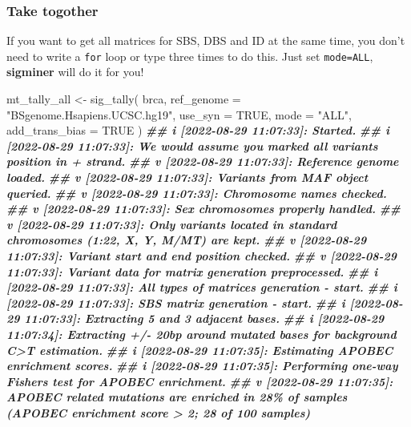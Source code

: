 \documentclass[
  12pt,
  a4paper,
  twoside]{book}
\newenvironment{Shaded}{\begin{snugshade}}{\end{snugshade}}
\newcommand{\AttributeTok}[1]{\textcolor[rgb]{0.77,0.63,0.00}{#1}}
\newcommand{\ConstantTok}[1]{\textcolor[rgb]{0.00,0.00,0.00}{#1}}
\newcommand{\DocumentationTok}[1]{\textcolor[rgb]{0.56,0.35,0.01}{\textbf{\textit{#1}}}}
\newcommand{\FunctionTok}[1]{\textcolor[rgb]{0.00,0.00,0.00}{#1}}
\newcommand{\NormalTok}[1]{#1}
\newcommand{\OtherTok}[1]{\textcolor[rgb]{0.56,0.35,0.01}{#1}}
\newcommand{\StringTok}[1]{\textcolor[rgb]{0.31,0.60,0.02}{#1}}
\begin{document}
\hypertarget{take-togother}{%
\subsubsection{Take togother}\label{take-togother}}

If you want to get all matrices for SBS, DBS and ID at the same time, you don't need to write a \texttt{for} loop or type three times to do this.
Just set \texttt{mode=\textquotesingle{}ALL\textquotesingle{}}, \textbf{sigminer} will do it for you!

\begin{Shaded}
\begin{Highlighting}[]
\NormalTok{mt\_tally\_all }\OtherTok{\textless{}{-}} \FunctionTok{sig\_tally}\NormalTok{(}
\NormalTok{  brca,}
  \AttributeTok{ref\_genome =} \StringTok{"BSgenome.Hsapiens.UCSC.hg19"}\NormalTok{,}
  \AttributeTok{use\_syn =} \ConstantTok{TRUE}\NormalTok{,}
  \AttributeTok{mode =} \StringTok{"ALL"}\NormalTok{,}
  \AttributeTok{add\_trans\_bias =} \ConstantTok{TRUE}
\NormalTok{)}
\DocumentationTok{\#\# i [2022{-}08{-}29 11:07:33]: Started.}
\DocumentationTok{\#\# i [2022{-}08{-}29 11:07:33]: We would assume you marked all variants\textquotesingle{} position in + strand.}
\DocumentationTok{\#\# v [2022{-}08{-}29 11:07:33]: Reference genome loaded.}
\DocumentationTok{\#\# v [2022{-}08{-}29 11:07:33]: Variants from MAF object queried.}
\DocumentationTok{\#\# v [2022{-}08{-}29 11:07:33]: Chromosome names checked.}
\DocumentationTok{\#\# v [2022{-}08{-}29 11:07:33]: Sex chromosomes properly handled.}
\DocumentationTok{\#\# v [2022{-}08{-}29 11:07:33]: Only variants located in standard chromosomes (1:22, X, Y, M/MT) are kept.}
\DocumentationTok{\#\# v [2022{-}08{-}29 11:07:33]: Variant start and end position checked.}
\DocumentationTok{\#\# v [2022{-}08{-}29 11:07:33]: Variant data for matrix generation preprocessed.}
\DocumentationTok{\#\# i [2022{-}08{-}29 11:07:33]: All types of matrices generation {-} start.}
\DocumentationTok{\#\# i [2022{-}08{-}29 11:07:33]: SBS matrix generation {-} start.}
\DocumentationTok{\#\# i [2022{-}08{-}29 11:07:33]: Extracting 5\textquotesingle{} and 3\textquotesingle{} adjacent bases.}
\DocumentationTok{\#\# i [2022{-}08{-}29 11:07:34]: Extracting +/{-} 20bp around mutated bases for background C\textgreater{}T estimation.}
\DocumentationTok{\#\# i [2022{-}08{-}29 11:07:35]: Estimating APOBEC enrichment scores.}
\DocumentationTok{\#\# i [2022{-}08{-}29 11:07:35]: Performing one{-}way Fisher\textquotesingle{}s test for APOBEC enrichment.}
\DocumentationTok{\#\# v [2022{-}08{-}29 11:07:35]: APOBEC related mutations are enriched in 28\% of samples (APOBEC enrichment score \textgreater{} 2; 28 of 100 samples)}

\end{Highlighting}
\end{Shaded}
\end{document}
